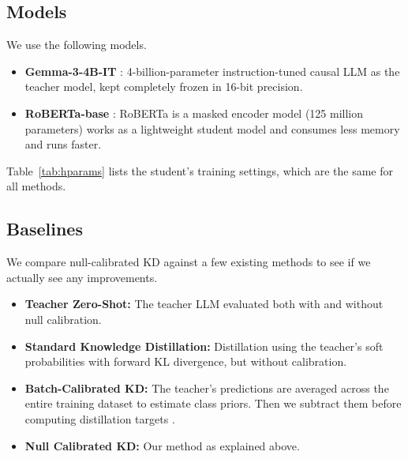\documentclass[11pt]{article}
\begin{document}
\subsection{Models}

We use the following models.
\begin{itemize}
    \item \textbf{Gemma-3-4B-IT} \citep{gemma2025gemma3}:  4-billion-parameter instruction-tuned causal LLM as the teacher model, kept completely frozen in 16-bit precision.
    \item \textbf{RoBERTa-base} \citep{liu2019roberta}: RoBERTa is a  masked encoder model (125 million parameters) works as a lightweight student model and consumes less memory and runs faster.
\end{itemize}
Table~\ref{tab:hparams} lists the student's training settings, which are the same for all methods.

\begin{table}[t]
\centering
\small
{}
\caption{Student training settings, shared by all methods.}
\label{tab:hparams}
\end{table}

\subsection{Baselines}

We compare null-calibrated KD against a few existing methods to see if we actually see any improvements.
\begin{itemize}
    \item \textbf{Teacher Zero-Shot:} The teacher LLM evaluated both with and without null calibration.
    \item \textbf{Standard Knowledge Distillation:} Distillation using the teacher's soft probabilities with forward KL divergence, but without calibration.
    \item \textbf{Batch-Calibrated KD:} The teacher's predictions are averaged across the entire training dataset to estimate class priors. Then we subtract them before computing distillation targets \citep{zhou2024batch}.
    \item \textbf{Null Calibrated KD:} Our method as explained above.
\end{itemize}
\end{document}
